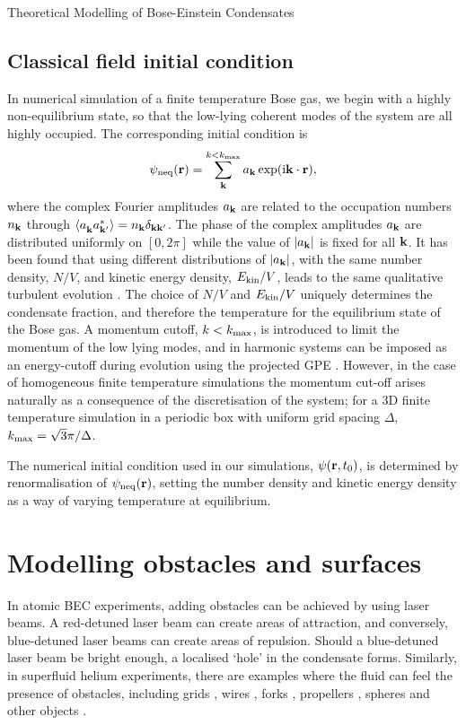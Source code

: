 \begin{chapter}{\label{cha:theoretical_model}Theoretical Modelling of Bose-Einstein Condensates}
\subsection{\label{section:cfieldinitcond} Classical field initial condition}
	In numerical simulation of a finite temperature Bose gas, we begin with a highly non-equilibrium state, so that the low-lying coherent modes of the system are all highly occupied. The corresponding initial condition is
	\begin{equation}
	\psi_{\rm neq}({\bf r}) = \sum \limits_{\bf k}^{k<k_{\rm max}} a_{\bf k} \exp (\mathrm{i}{\bf k}\cdot{\bf r}),
	\label{eq:cFieldIC}
	\end{equation}
	where the complex Fourier amplitudes $a_{\bf k}$ are related to the occupation numbers $n_{\bf k}$ through $\braket{a_{\bf k}^{\,}a_{\bf k'}^*} = n_{\bf k}\delta_{\bf kk'}$. The phase of the complex amplitudes $a_{\bf k}$ are distributed uniformly on $[0,2\pi]$ while the value of $|a_{\bf k}|$ is fixed for all $\bf k$. It has been found that using different distributions of $|a_{\bf k}|$, with the same number density, $N/V$, and kinetic energy density, $E_{\rm kin}/V$, leads to the same qualitative turbulent evolution \cite{PhysRevA.66.013603}. The choice of $N/V$ and $E_{\rm kin}/V$ uniquely determines the condensate fraction, and therefore the temperature for the equilibrium state of the Bose gas. A momentum cutoff, $k<k_{\rm max}$, is introduced to limit the momentum of the low lying modes, and in harmonic systems can be imposed as an energy-cutoff during evolution using the projected GPE \cite{PhysRevLett.87.160402}. However, in the case of homogeneous finite temperature simulations the momentum cut-off arises naturally as a consequence of the discretisation of the system; for a 3D finite temperature simulation in a periodic box with uniform grid spacing $\Delta$, $k_{\rm max}=\sqrt{3} \pi / \Delta$.

	The numerical initial condition used in our simulations, $\psi({\bf r},t_0)$, is determined by renormalisation of $\psi_{\rm neq}({\bf r})$, setting the number density and kinetic energy density as a way of varying temperature at equilibrium.

\section{\label{section:potentials}Modelling obstacles and surfaces}
In atomic BEC experiments, adding obstacles can be achieved by using laser beams. A red-detuned laser beam can create areas of attraction, and conversely, blue-detuned laser beams can create areas of repulsion. Should a blue-detuned laser beam be bright enough, a localised `hole' in the condensate forms. Similarly, in superfluid helium experiments, there are examples where the fluid can feel the presence of obstacles, including grids \cite{Davis2000,brad05}, wires \cite{Guenault1986,Bradley2011,Fisher2001}, forks \cite{Blaauwgeers2007,Bradley2012}, propellers \cite{Tabeling,Salort}, spheres \cite{Schoepe1995} and other objects \cite{VinenSkrbek2008}.


\end{chapter}

